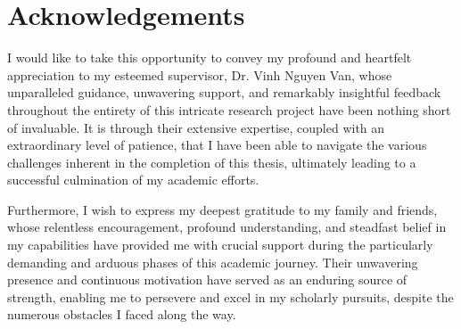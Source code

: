 \chapter*{Acknowledgements}
I would like to take this opportunity to convey my profound and heartfelt appreciation to my esteemed supervisor, Dr. Vinh Nguyen Van, whose unparalleled guidance, unwavering support, and remarkably insightful feedback throughout the entirety of this intricate research project have been nothing short of invaluable. It is through their extensive expertise, coupled with an extraordinary level of patience, that I have been able to navigate the various challenges inherent in the completion of this thesis, ultimately leading to a successful culmination of my academic efforts.

Furthermore, I wish to express my deepest gratitude to my family and friends, whose relentless encouragement, profound understanding, and steadfast belief in my capabilities have provided me with crucial support during the particularly demanding and arduous phases of this academic journey. Their unwavering presence and continuous motivation have served as an enduring source of strength, enabling me to persevere and excel in my scholarly pursuits, despite the numerous obstacles I faced along the way.
